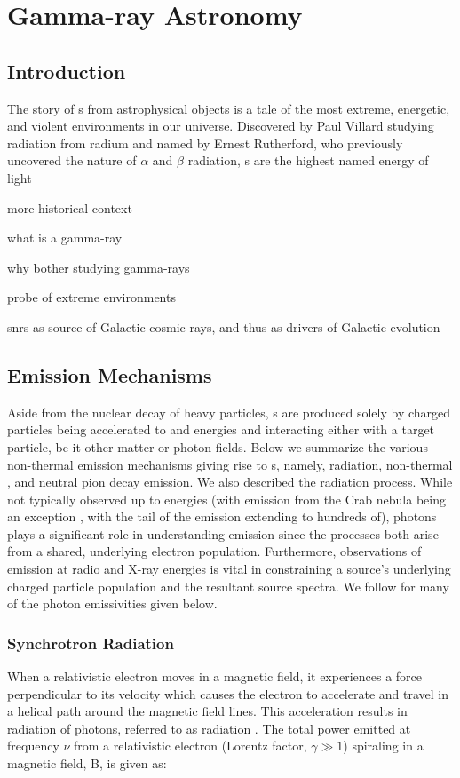 \chapter{Gamma-ray Astronomy }
\label{chap:gamAstr}

\section{Introduction}\label{gamAstr:intro}
The story of \gam{}s from astrophysical objects is a tale of the most extreme, energetic, and violent environments in our universe. Discovered by Paul Villard studying radiation from radium and named by Ernest Rutherford, who previously uncovered the nature of $\alpha$ and $\beta$ radiation, \gam{}s are the highest named energy of light 

more historical context 

what is a gamma-ray

why bother studying gamma-rays

probe of extreme environments

snrs as source of Galactic cosmic rays, and thus as drivers of Galactic evolution

\section{\gam{} Emission Mechanisms }\label{gamAstr:Emiss}

Aside from the  nuclear decay of heavy particles, \gam{}s are produced solely by charged particles being accelerated to\gev{} and\tev{} energies and interacting either with a target particle, be it other matter or photon fields.  Below we summarize the various non-thermal emission mechanisms giving rise to \gam{}s, namely, \ic{} radiation, non-thermal \brems{}, and neutral pion decay emission. We also described the \sync{} radiation process. While not typically observed up to \gam{} energies (with \sync{}  emission from the Crab nebula being an exception \cite{AbdoCrab}, with the tail of the emission extending to hundreds of\mev{}), \sync{} photons plays a significant role in understanding \ic{} \gam{} emission since the processes both arise from a shared, underlying electron population. Furthermore, observations of \sync{} emission at radio and X-ray energies is vital in  constraining a source's underlying charged particle population and the resultant \gam{} source spectra. We follow \cite{Houck06} for many of the photon emissivities given below.

\subsection{Synchrotron Radiation}\label{gamAstr:sync}
When a relativistic electron moves in a magnetic field, it experiences a force perpendicular to its velocity which causes the electron to accelerate and travel in a helical path around the magnetic field lines. This acceleration results in radiation of photons, referred to as \sync{} radiation \cite{Blumenthal70,Pacholczyk70,Rybicki86,Longair11}. The total power emitted at frequency $\nu$ from a relativistic electron (Lorentz factor, $\gamma \gg 1$) spiraling in a magnetic field, B, is given as:


